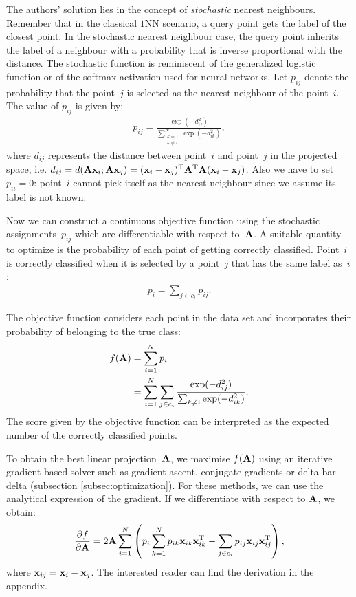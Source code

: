 	The authors' solution lies in the concept of \textit{stochastic} nearest
	neighbours. Remember that in the classical $1$NN scenario, a query point gets the label of the closest point. In the stochastic nearest neighbour 
	case, the query point inherits the label of a neighbour with a probability that is inverse proportional with the distance. The stochastic function is reminiscent of the generalized logistic function or of the softmax activation used for neural networks. Let $p_{ij}$ denote the probability that the point~$j$ is selected as the nearest neighbour of the point~$i$. The value of $p_{ij}$ is given by:
	\begin{align}
		p_{ij} = \frac{
						\exp(-d_{ij}^2)
					  }{
						\sum_{\substack{k=1 \\k\neq i}}^N\exp(-d_{ik}^2)
					  },
	\label{eq:stochastic-neighbour}
	\end{align} where $d_{ij}$ represents the distance between point~$i$ and point~$j$ in the projected space, i.e. $d_{ij} = d(\mathbf{A}\mathbf{x}_i;\mathbf{A}\mathbf{x}_j) = (\mathbf{x}_i-\mathbf{x}_j)^\textrm{T}\mathbf{A}^\textrm{T}\mathbf{A}(\mathbf{x}_i-\mathbf{x}_j)$. Also we have to set $p_{ii}=0$: point~$i$ cannot pick itself as the nearest neighbour since we assume its label is not known.
	
	Now we can construct a continuous objective function using the stochastic assignments~$p_{ij}$ which are differentiable with respect to~$\mathbf{A}$. A suitable quantity to optimize is the probability of each point of getting correctly classified. Point~$i$ is correctly classified when it is selected by a point~$j$ that has the same label as~$i$:
	\begin{align}
		p_i = \sum_{j\in c_i} p_{ij}.
		\label{eq:nca-p-i}
	\end{align}
	
	The objective function considers each point in the data set and incorporates their probability of belonging to the true class:
	\begin{align}
		f(\mathbf{A}) &= \sum_{i=1}^N p_i\notag\\
			   &= \sum_{i=1}^N \sum_{j\in c_i} \frac{
								\exp(-d_{ij}^2)
							  }{
								\sum_{k\neq i}\exp(-d_{ik}^2)
							  }.
	\label{eq:nca-obj}
	\end{align}
	The score given by the objective function can be interpreted as the expected number of the correctly classified points.
	
	To obtain the best linear projection~$\mathbf{A}$, we maximise $f(\mathbf{A})$ using an iterative gradient based solver such as gradient ascent, conjugate gradients or delta-bar-delta (subsection \ref{subsec:optimization}). For these methods, we can use the analytical expression of the gradient. If we differentiate with respect to $\mathbf{A}$, we obtain:
	\begin{align}
	  \frac{\partial f}{\partial	\mathbf{A}}=2\mathbf{A}\sum_{i=1}^{N}\left(p_i\sum_{k=1}^Np_{ik}\mathbf{x}_{ik}\mathbf{x}_{ik}^{\textrm{T}} -
	\sum_{j\in c_i}p_{ij}\mathbf{x}_{ij}\mathbf{x}_{ij}^{\textrm{T}} \right)\label{eq:nca-grad},
	\end{align}
	where $\mathbf{x}_{ij} = \mathbf{x}_i - \mathbf{x}_j$. The interested reader can find the derivation in the appendix. 

